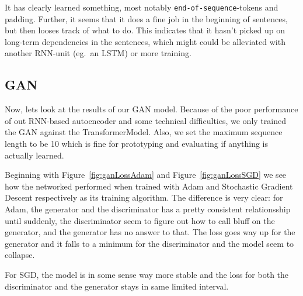 \documentclass{article}
\begin{document}
It has clearly learned something, most notably \texttt{end-of-sequence}-tokens
and padding. Further, it seems that it does a fine job in the beginning of
sentences, but then looses track of what to do. This indicates that it hasn't
picked up on long-term dependencies in the sentences, which might could be
alleviated with another RNN-unit (eg.\ an LSTM) or more training.

\subsection{GAN}

Now, lets look at the results of our GAN model. Because of the poor performance
of out RNN-based autoencoder and some technical difficulties, we only trained the
GAN against the TransformerModel. Also, we set the maximum sequence length to be
10 which is fine for prototyping and evaluating if anything is actually learned.

Beginning with Figure~\ref{fig:ganLossAdam} and Figure~\ref{fig:ganLossSGD} we
see how the networked performed when trained with Adam and Stochastic Gradient
Descent respectively as its training algorithm. The difference is very clear:
for Adam, the generator and the discriminator has a pretty consistent
relationsship until suddenly, the discriminator seem to figure out how to call
bluff on the generator, and the generator has no answer to that. The loss goes
way up for the generator and it falls to a minimum for the discriminator and the
model seem to collapse.

For SGD, the model is in some sense way more stable and the loss for both the
discriminator and the generator stays in same limited interval. 
\end{document}
